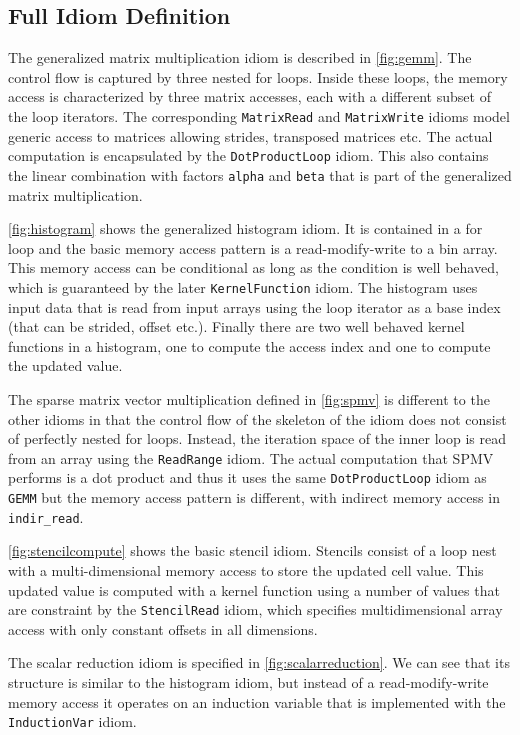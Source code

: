 \subsection{Full Idiom Definition}
The generalized matrix multiplication idiom is described in \autoref{fig:gemm}.
The control flow is captured by three nested for loops.
Inside these loops, the memory access is characterized by three matrix accesses, each with a different subset of the
loop iterators.
The corresponding \texttt{MatrixRead} and \texttt{MatrixWrite} idioms model generic access to matrices allowing
strides, transposed matrices etc.
The actual computation is encapsulated by the \texttt{DotProductLoop} idiom.
This also contains the linear combination with factors \texttt{alpha} and \texttt{beta} that is part of the generalized
matrix multiplication.

\autoref{fig:histogram} shows the generalized histogram idiom.
It is contained in a for loop and the basic memory access pattern is a read-modify-write to a bin array.
This memory access can be conditional as long as the condition is well behaved, which is guaranteed by the later
\texttt{KernelFunction} idiom.
The histogram uses input data that is read from input arrays using the loop iterator as a base index (that can be
strided, offset etc.).
Finally there are two well behaved kernel functions in a histogram, one to compute the access index and one to compute
the updated value.

The sparse matrix vector multiplication defined in \autoref{fig:spmv} is different to the other idioms in that
the control flow of the skeleton of the idiom does not consist of perfectly nested for loops.
Instead, the iteration space of the inner loop is read from an array using the \texttt{ReadRange} idiom.
The actual computation that SPMV performs is a dot product and thus it uses the same \texttt{DotProductLoop} idiom as
\texttt{GEMM} but the memory access pattern is different, with indirect memory access in \texttt{indir\_read}.

    \autoref{fig:stencilcompute} shows the basic stencil idiom.
    Stencils consist of a loop nest with a multi-dimensional memory access to
    store the updated cell value.
    This updated value is computed with a kernel function using a number of
    values that are constraint by the
    \texttt{StencilRead} idiom, which specifies multidimensional array access
    with only constant offsets in all dimensions.

The scalar reduction idiom is specified in \autoref{fig:scalarreduction}.
We can see that its structure is similar to the histogram idiom, but instead of a read-modify-write memory access
it operates on an induction variable that is implemented with the \texttt{InductionVar} idiom.

